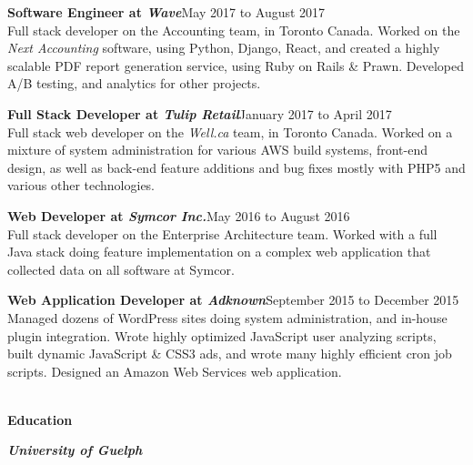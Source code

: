 \documentclass[9pt]{extarticle}
\begin{document}
{    \textbf{Software Engineer at \textit{Wave}}{\color{darkgrey}\hfill{\small{May 2017 to August 2017\\[5pt]}}
        Full stack developer on the Accounting team, in Toronto Canada. Worked on the \textit{Next Accounting} software, using Python, Django, React, and created a highly scalable PDF report generation service, using Ruby on Rails \& Prawn. Developed A/B testing, and analytics for other projects.\\
    }

    \textbf{Full Stack Developer at \textit{Tulip Retail}}{\color{darkgrey}\hfill{\small{January 2017 to April 2017\\[5pt]}}
        Full stack web developer on the \textit{Well.ca} team, in Toronto Canada. Worked on a mixture of system administration for various AWS build systems, front-end design, as well as back-end feature additions and bug fixes mostly with PHP5 and various other technologies.\\
    }

    \textbf{Web Developer at \textit{Symcor Inc.}}{\color{darkgrey}\hfill{\small{May 2016 to August 2016\\[5pt]}}
        Full stack developer on the Enterprise Architecture team. Worked with a full Java stack doing feature implementation on a complex web application that collected data on all software at Symcor. \\
    }

    \textbf{Web Application Developer at \textit{Adknown}}{\color{darkgrey}\hfill{\small{September 2015 to December 2015\\[5pt]}}
        Managed dozens of WordPress sites doing system administration, and in-house plugin integration. Wrote highly optimized JavaScript user analyzing scripts, built dynamic JavaScript \& CSS3 ads, and wrote many highly efficient cron job scripts. Designed an Amazon Web Services web application.\\
    }
    {\color{lightgrey}{\centerline{\rule{17cm}{0.4pt}}}}
    \begin{Large}
        \color{em-light}\textbf{\\[5pt]Education\\}
    \end{Large}

    \textit{\textbf{University of Guelph}}{}
}
\end{document}

